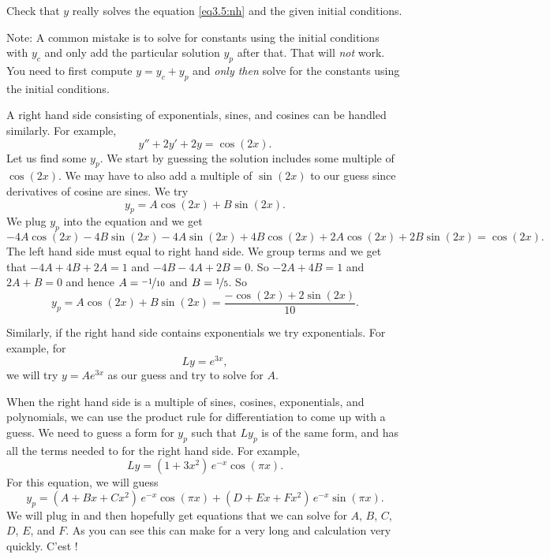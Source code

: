 \begin{exercise}
Check that $y$ really solves the equation \eqref{eq3.5:nh}
and the given initial conditions.
\end{exercise}

Note: A common mistake is to solve for constants using the initial
conditions with $y_c$ and only add the particular solution $y_p$ after that.
That will \emph{not} work.  You need to first compute $y = y_c + y_p$ and
\emph{only then} solve for the constants using the initial conditions.

\medskip

A right hand side consisting of exponentials, sines, and cosines
can be handled similarly.  For example,
\begin{equation*}
y''+2y'+2y = \cos (2x) .
\end{equation*}
Let us find some $y_p$.  We start by guessing the solution
includes some multiple of $\cos(2x)$.
We may have to also
add a multiple of $\sin (2x)$ to our guess since derivatives of cosine are
sines.  We try
\begin{equation*}
y_p = A \cos (2x) + B \sin (2x) .
\end{equation*}
We plug $y_p$ into the equation and we get
\begin{equation*}
-4 A \cos (2x) - 4 B \sin (2x) 
-4A \sin (2x) + 4B \cos (2x)
+ 2A \cos (2x) + 2B \sin (2x)
= \cos (2x) .
\end{equation*}
The left hand side must equal to right hand side.  We group terms and
we get that $-4A + 4B + 2A = 1$ and
$-4B - 4A + 2B = 0$.  So $-2A+4B =1$ and $2A+B=0$ and hence
$A=\nicefrac{-1}{10}$ and $B=\nicefrac{1}{5}$.  So
\begin{equation*}
y_p = A \cos (2x) + B \sin (2x) = \frac{-\cos (2x) + 2 \sin (2x)}{10} .
\end{equation*}

Similarly, if the right hand side contains exponentials we try
exponentials.  For example, for
\begin{equation*}
Ly = e^{3x},
\end{equation*}
we will try $y = A e^{3x}$ as our guess and try to solve for $A$.

\medskip

When the right hand side is a multiple of sines, cosines, exponentials,
and polynomials, we can use the product rule
for differentiation to come up with a guess.  We
need to guess a
form for $y_p$ such that $Ly_p$ is of the same form, and 
has all the terms needed to for 
the right hand side.
For example,
\begin{equation*}
Ly = (1+3x^2)\,e^{-x}\cos (\pi x) .
\end{equation*}
For this equation, we will guess
\begin{equation*}
y_p = (A + Bx + Cx^2)\,e^{-x} \cos (\pi x) + 
(D + Ex + Fx^2)\,e^{-x} \sin (\pi x) .
\end{equation*}
We will plug in and then hopefully get equations that we can solve for
$A$, $B$, $C$, $D$, $E$, and $F$.
As you can see this can make for a very long and
calculation very quickly.  C'est ! %

